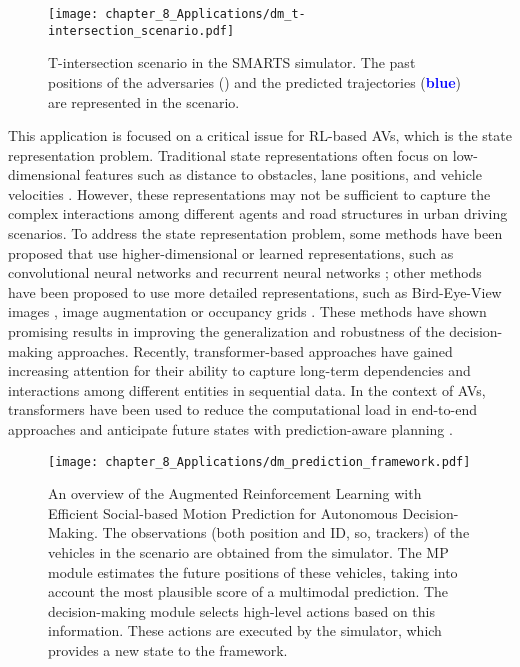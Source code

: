 \begin{figure}[h]
	\centering
	\texttt{[image: chapter\_8\_Applications/dm\_t-intersection\_scenario.pdf]}
	\captionsetup{justification=justified}
	\caption[T-intersection scenario in the SMARTS simulator]{T-intersection scenario in the SMARTS simulator. The past positions of the adversaries (\textbf{\color{YellowOrange}{yellow}}) and the predicted trajectories (\textbf{\textcolor{blue}{blue}}) are represented in the scenario.}
	\label{fig:chapter_8_Applications/dm_t-intersection_scenario}
\end{figure}

This application is focused on a critical issue for RL-based AVs, which is the state representation problem. Traditional state representations often focus on low-dimensional features such as distance to obstacles, lane positions, and vehicle velocities \cite{Rodrigo2023}. However, these representations may not be sufficient to capture the complex interactions among different agents and road structures in urban driving scenarios. To address the state representation problem, some methods have been proposed that use higher-dimensional or learned representations, such as convolutional neural networks \cite{Johan2018} and recurrent neural networks \cite{Tram2018}; other methods have been proposed to use more detailed representations, such as  Bird-Eye-View images \cite{zhang2021endtoend}, image augmentation \cite{kostrikov2021image} or occupancy grids \cite{moghadam2019hierarchical}. These methods have shown promising results in improving the generalization and robustness of the decision-making approaches. Recently, transformer-based approaches have gained increasing attention for their ability to capture long-term dependencies and interactions among different entities in sequential data. In the context of AVs, transformers have been used to reduce the computational load in end-to-end approaches \cite{Li4} and anticipate future states with prediction-aware planning \cite{valiente2022predictionaware}.

\begin{figure}[h]
	\centering        
	\texttt{[image: chapter\_8\_Applications/dm\_prediction\_framework.pdf]}
	\captionsetup{justification=justified}
	\caption[An overview of the Augmented Reinforcement Learning with Efficient Social-based Motion Prediction for Autonomous Decision-Making]{An overview of the Augmented Reinforcement Learning with Efficient Social-based Motion Prediction for Autonomous Decision-Making. The observations (both position and ID, so, trackers) of the vehicles in the scenario are obtained from the simulator. The MP module estimates the future positions of these vehicles, taking into account the most plausible score of a multimodal prediction. The decision-making module selects high-level actions based on this information. These actions are executed by the simulator, which provides a new state to the framework. }
	\label{fig:chapter_8_Applications/dm_prediction_framework}
\end{figure}

